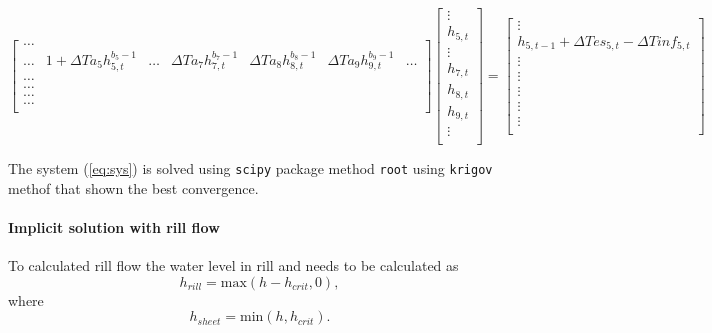         \begin{dmath}
        \begin{bmatrix}
        \hdots& & & & & &  \\
        \hdots  & 1+\Delta T a_5h^{b_{5}-1}_{5,t} & \hdots &  \Delta T a_7h^{b_{7}-1}_{7,t} &  \Delta T a_8h^{b_{8}-1}_{8,t} & \Delta T a_9 h^{b_{9}-1}_{9,t} & \hdots \\
        \hdots&  & & & & &  \\
        \hdots& && &  &  & \\
        \hdots& && &  &   & \\
        \hdots& && &  &   & \\

        \end{bmatrix} 
        \begin{bmatrix}
         \vdots \\
         h_{5,t} \\
         \vdots \\
         h_{7,t} \\
         h_{8,t} \\
         h_{9,t} \\
         \vdots \\
        \end{bmatrix}
        =
        \begin{bmatrix}
         \vdots \\
        h_{5,t-1} + \Delta T es_{5,t} - \Delta T inf_{5,t} \\
         \vdots \\
         \vdots \\
         \vdots \\
         \vdots \\
         \vdots \\
        \end{bmatrix}
        \label{eq:sys}
        \end{dmath}

        The system (\ref{eq:sys}) is solved using \texttt{scipy} package method \texttt{root}
        using \texttt{krigov} methof that shown the best convergence.


        \paragraph{Implicit solution with rill flow} To calculated rill flow the water level in rill and needs to be calculated as 
        \begin{equation}
        h_{rill} = \text{max}(h-h_{crit},0),
            \label{eq:hrill2}
        \end{equation}
        where 
        \begin{equation}
        h_{sheet} = \text{min}(h,h_{crit}).
            \label{eq:hsheet2}
        \end{equation}

